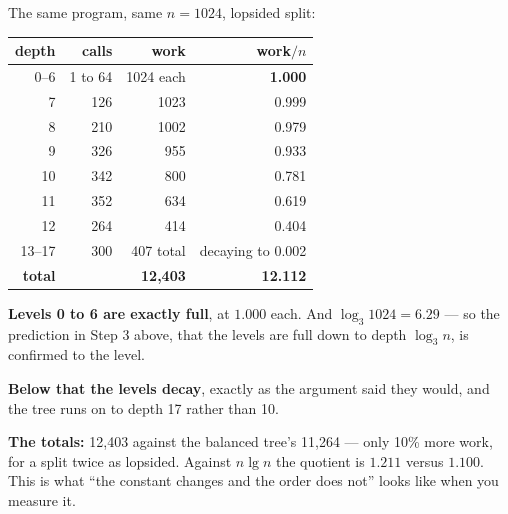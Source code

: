 \begin{worked}
The same program, same $n = 1024$, lopsided split:

\begin{center}
\begin{tabular}{@{}rrrr@{}}
\toprule
\rowcolor{primary!15}
depth & calls & work & work$/n$ \\
\midrule
0--6 & 1 to 64 & 1024 each & \textbf{1.000} \\
7  & 126 & 1023 & 0.999 \\
8  & 210 & 1002 & 0.979 \\
9  & 326 &  955 & 0.933 \\
10 & 342 &  800 & 0.781 \\
11 & 352 &  634 & 0.619 \\
12 & 264 &  414 & 0.404 \\
13--17 & 300 & 407 total & decaying to 0.002 \\
\midrule
\textbf{total} & & \textbf{12{,}403} & \textbf{12.112} \\
\bottomrule
\end{tabular}
\end{center}

\smallskip
\textbf{Levels 0 to 6 are exactly full}, at $1.000$ each. And
$\log_{3} 1024 = 6.29$ --- so the prediction in Step 3 above, that the levels
are full down to depth $\log_{3} n$, is confirmed to the level.

\smallskip
\textbf{Below that the levels decay}, exactly as the argument said they would,
and the tree runs on to depth 17 rather than 10.

\smallskip
\textbf{The totals:} 12{,}403 against the balanced tree's 11{,}264 --- only
10\% more work, for a split twice as lopsided. Against $n \lg n$ the quotient
is $1.211$ versus $1.100$. This is what ``the constant changes and the order
does not'' looks like when you measure it.
\end{worked}

